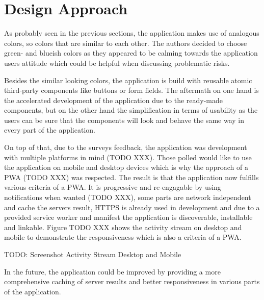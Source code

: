 
\section{Design Approach}
\label{sec:implementationDesign}

As probably seen in the previous sections, the application makes use of analogous colors, so colors that are similar to each other. The authors decided to choose green- and blueish colors as they appeared to be calming towards the application users attitude which could be helpful when discussing problematic risks.

Besides the similar looking colors, the application is build with reusable atomic third-party components like buttons or form fields. The aftermath on one hand is the accelerated development of the application due to the ready-made components, but on the other hand the simplification in terms of usability as the users can be sure that the components will look and behave the same way in every part of the application.

On top of that, due to the surveys feedback, the application was development with multiple platforms in mind (TODO XXX). Those polled would like to use the application on mobile and desktop devices which is why the approach of a PWA (TODO XXX) was respected. The result is that the application now fulfills various criteria of a PWA. It is progressive and re-engagable by using notifications when wanted (TODO XXX), some parts are network independent and cache the servers result, HTTPS is already used in development and due to a provided service worker and manifest the application is discoverable, installable and linkable. Figure TODO XXX shows the activity stream on desktop and mobile to demonstrate the responsiveness which is also a criteria of a PWA.

TODO: Screenshot Activity Stream Desktop and Mobile

In the future, the application could be improved by providing a more comprehensive caching of server results and better responsiveness in various parts of the application.
